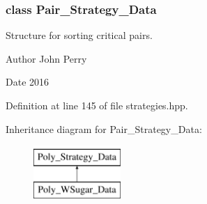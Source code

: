 \subsubsection{class Pair\+\_\+\+Strategy\+\_\+\+Data}
Structure for sorting critical pairs. 

\begin{DoxyAuthor}{Author}
John Perry 
\end{DoxyAuthor}
\begin{DoxyDate}{Date}
2016 
\end{DoxyDate}


Definition at line 145 of file strategies.\+hpp.

Inheritance diagram for Pair\+\_\+\+Strategy\+\_\+\+Data\+:\begin{figure}[H]
\begin{center}
\leavevmode
\includegraphics[height=2.000000cm]{group__strategygroup}
\end{center}
\end{figure}
